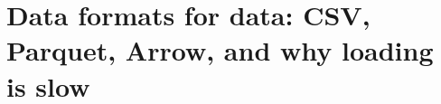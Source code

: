 \chapter{Data formats for data: CSV, Parquet, Arrow, and why loading is slow}
\label{ch:data-formats-for-data-csv-parquet-arrow}

